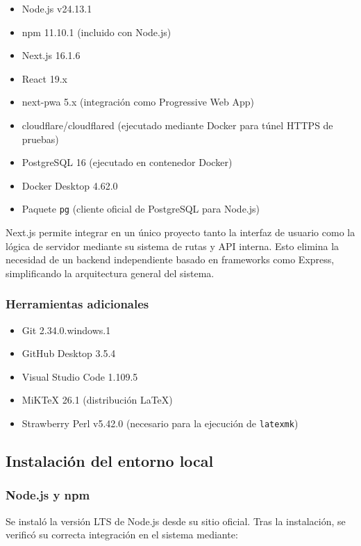 \begin{itemize}
    \item Node.js v24.13.1
    \item npm 11.10.1 (incluido con Node.js)
    \item Next.js 16.1.6
    \item React 19.x
    \item next-pwa 5.x (integración como Progressive Web App)
    \item cloudflare/cloudflared (ejecutado mediante Docker para túnel HTTPS de pruebas)
    \item PostgreSQL 16 (ejecutado en contenedor Docker)
    \item Docker Desktop 4.62.0
    \item Paquete \texttt{pg} (cliente oficial de PostgreSQL para Node.js)
\end{itemize}

Next.js permite integrar en un único proyecto tanto la interfaz de usuario como la lógica de servidor mediante su sistema de rutas y API interna. Esto elimina la necesidad de un backend independiente basado en frameworks como Express, simplificando la arquitectura general del sistema.

\subsubsection*{Herramientas adicionales}

\begin{itemize}
    \item Git 2.34.0.windows.1
    \item GitHub Desktop 3.5.4
    \item Visual Studio Code 1.109.5
    \item MiKTeX 26.1 (distribución \LaTeX)
    \item Strawberry Perl v5.42.0 (necesario para la ejecución de \texttt{latexmk})
\end{itemize}

\subsection{Instalación del entorno local}

\subsubsection*{Node.js y npm}

Se instaló la versión LTS de Node.js desde su sitio oficial.  
Tras la instalación, se verificó su correcta integración en el sistema mediante:


